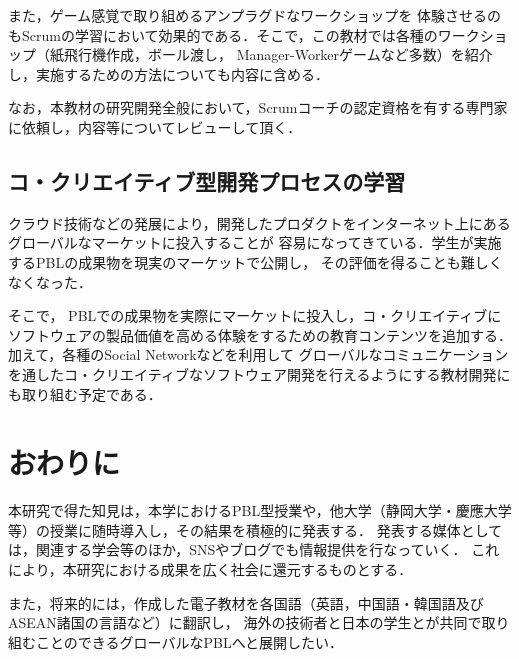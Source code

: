 \documentclass[a4j,twoside]{jarticle}
\begin{document}
\begin{multicols}{2}
	また，ゲーム感覚で取り組めるアンプラグドなワークショップを
	体験させるのもScrumの学習において効果的である．そこで，この教材では各種のワークショップ（紙飛行機作成，ボール渡し，
	Manager-Workerゲームなど多数）を紹介し，実施するための方法についても内容に含める．

	なお，本教材の研究開発全般において，Scrumコーチの認定資格を有する専門家に依頼し，内容等についてレビューして頂く．

\subsection{コ・クリエイティブ型開発プロセスの学習}
	クラウド技術などの発展により，開発したプロダクトをインターネット上にあるグローバルなマーケットに投入することが
	容易になってきている．学生が実施するPBLの成果物を現実のマーケットで公開し，
	その評価を得ることも難しくなくなった．
	
	そこで，
	PBLでの成果物を実際にマーケットに投入し，コ・クリエイティブにソフトウェアの製品価値を高める体験をするための教育コンテンツを追加する．
	加えて，各種のSocial Networkなどを利用して
	グローバルなコミュニケーションを通したコ・クリエイティブなソフトウェア開発を行えるようにする教材開発にも取り組む予定である．

\section{おわりに}\label{sec:fin}
	本研究で得た知見は，本学におけるPBL型授業や，他大学（静岡大学・慶應大学等）の授業に随時導入し，その結果を積極的に発表する．
	発表する媒体としては，関連する学会等のほか，SNSやブログでも情報提供を行なっていく．
	これにより，本研究における成果を広く社会に還元するものとする．
	
	また，将来的には，作成した電子教材を各国語（英語，中国語・韓国語及びASEAN諸国の言語など）に翻訳し，
	海外の技術者と日本の学生とが共同で取り組むことのできるグローバルなPBLへと展開したい．


\end{multicols}
\end{document}
